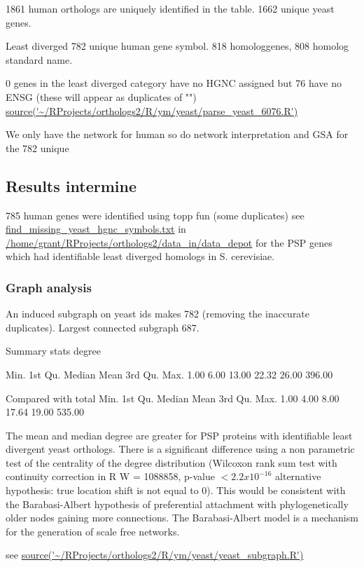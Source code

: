 1861 human orthologs are uniquely identified in the table. 1662 unique yeast genes.  

Least diverged 782 unique human gene symbol. 818 homologgenes, 808 homolog standard name.

0 genes in the least diverged category have no HGNC assigned but 76 have no ENSG (these will appear as duplicates of "") \url{source('~/RProjects/orthologs2/R/ym/yeast/parse_yeast_6076.R')}

We only have the network for human so do network interpretation and GSA for the 782  unique
\subsection{Results intermine}
785 human genes were identified using topp fun  (some duplicates) see \url{find_missing_yeast_hgnc_symbols.txt} in \url{/home/grant/RProjects/orthologs2/data_in/data_depot} for the PSP genes which had identifiable least diverged homologs in S. cerevisiae. 
\subsubsection{Graph analysis}
An induced subgraph on yeast ids makes 782 (removing the inaccurate duplicates). Largest connected subgraph 687. 

Summary stats degree

Min. 1st Qu.  Median    Mean 3rd Qu.    Max. 
   1.00    6.00   13.00   22.32   26.00  396.00 
   
   Compared with total 
   Min. 1st Qu.  Median    Mean 3rd Qu.    Max. 
   1.00    4.00    8.00   17.64   19.00  535.00 


The mean and median degree are greater for PSP proteins with identifiable least divergent yeast orthologs. There is a significant difference using a non parametric test of the centrality of the degree distribution (Wilcoxon rank sum test with continuity correction in R W = 1088858, p-value $< 2.2 x 10^{-16}$
alternative hypothesis: true location shift is not equal to 0). This would be consistent with the Barabasi-Albert hypothesis of preferential attachment with phylogenetically older nodes gaining more connections. The Barabasi-Albert model is a mechanism for the generation of scale free networks. 



see \url{source('~/RProjects/orthologs2/R/ym/yeast/yeast_subgraph.R')}



